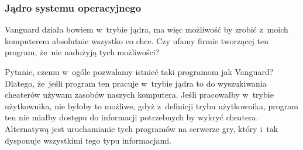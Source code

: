 \documentclass[10pt,t]{beamer}
\begin{document}
\begin{frame}
  \frametitle{Jądro systemu operacyjnego}


  Vanguard działa bowiem w~trybie jądra, ma więc możliwość by zrobić
  z~moich komputerem absolutnie wszystko co chce. Czy ufamy firmie
  tworzącej ten program, że~nie nadużyją tych możliwości?

  Pytanie, czemu w~ogóle pozwalamy istnieć taki programom jak Vanguard?
  Dlatego, że~jeśli program ten pracuje w~trybie jądra to do wyszukiwania
  cheaterów używam zasobów \alert{naszych} komputera. Jeśli pracowałby
  w~trybie użytkownika, nie byłoby to możliwe, gdyż z~definicji trybu
  użytkownika, program ten nie miałby dostępu do informacji potrzebnych by
  wykryć cheatera. Alternatywą jest uruchamianie tych programów na serwerze
  gry, który i~tak dysponuje wszystkimi tego typu informacjami.





\end{frame}
\end{document}

